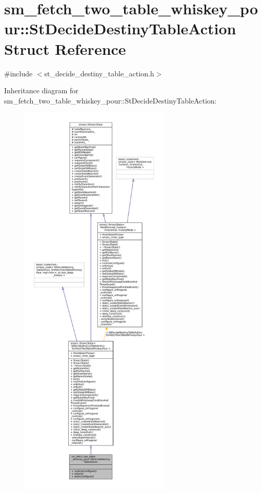 \hypertarget{structsm__fetch__two__table__whiskey__pour_1_1StDecideDestinyTableAction}{}\section{sm\+\_\+fetch\+\_\+two\+\_\+table\+\_\+whiskey\+\_\+pour\+:\+:St\+Decide\+Destiny\+Table\+Action Struct Reference}
\label{structsm__fetch__two__table__whiskey__pour_1_1StDecideDestinyTableAction}


{\ttfamily \#include $<$st\+\_\+decide\+\_\+destiny\+\_\+table\+\_\+action.\+h$>$}



Inheritance diagram for sm\+\_\+fetch\+\_\+two\+\_\+table\+\_\+whiskey\+\_\+pour\+:\+:St\+Decide\+Destiny\+Table\+Action\+:
\nopagebreak
\begin{figure}[H]
\begin{center}
\leavevmode
\includegraphics[height=550pt]{structsm__fetch__two__table__whiskey__pour_1_1StDecideDestinyTableAction__inherit__graph}
\end{center}
\end{figure}



